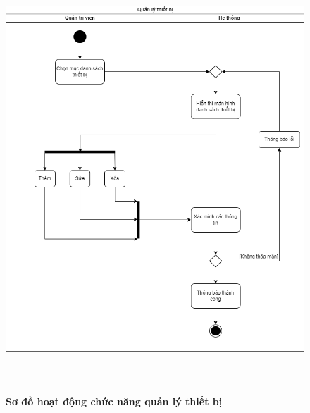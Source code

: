   \begin{figure}[H]
    \centering
    \includegraphics[width=13.5cm,height=16cm]{Images/activity/activity_manage_device.png}
    \caption[Sơ đồ hoạt động chức năng quản lý thiết bị]{\bfseries \fontsize{12pt}{0pt}
    \selectfont Sơ đồ hoạt động chức năng quản lý thiết bị}
    \label{activity_device_management} %
  \end{figure}


